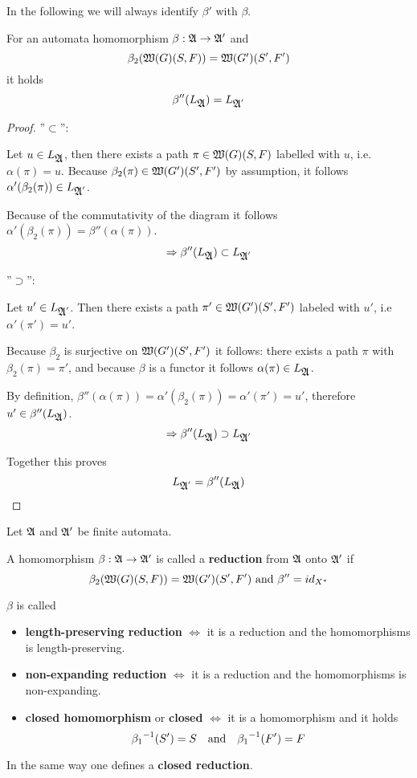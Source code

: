 In the following we will always identify $\beta'$ with $\beta$.

\begin{theorem}
For an automata homomorphism $\beta: \mbox{$\mathfrak{A}$} \to \mbox{$\mathfrak{A'}$}$ and
\[\beta_2(\mbox{$\mathfrak{W}({G})$}(S, F)) = \mbox{$\mathfrak{W}({G'})$}(S', F') \]
it holds
\[ \beta''(L_{\mbox{$\mathfrak{A}$}}) = L_{\mbox{$\mathfrak{A}$}'} \]
\end{theorem}

\begin{proof}\leavevmode

''$\subset$'':

Let $u \in L_{\mbox{$\mathfrak{A}$}}$, then there exists a path $\pi \in \mbox{$\mathfrak{W}({G})$}(S, F)$
labelled with $u$, i.e.\ $\alpha(\pi) = u$. Because $\beta_2(\pi) \in
\mbox{$\mathfrak{W}({G'})$}(S', F')$ by assumption, it follows $\alpha'(\beta_2(\pi)) \in
L_{\mbox{$\mathfrak{A}$}'}$.

Because of the commutativity of the diagram it follows $ \alpha'(\beta_2(\pi))
= \beta''(\alpha(\pi))$.
\[ \Rightarrow \beta''(L_{\mbox{$\mathfrak{A}$}}) \subset L_{\mbox{$\mathfrak{A}$}'} \]

''$\supset$'':

Let $u' \in L_{\mbox{$\mathfrak{A}$}'}$. Then there exists a path $\pi' \in \mbox{$\mathfrak{W}({G'})$}(S', F')$
labeled with $u'$, i.e\ $\alpha'(\pi') = u'$.

Because $\beta_2$ is surjective on $\mbox{$\mathfrak{W}({G'})$}(S', F')$ it follows: there
exists a path $\pi$ with $\beta_2(\pi) = \pi'$, and because $\beta$ is a functor
it follows $\alpha(\pi) \in L_{\mbox{$\mathfrak{A}$}}$.

By definition, $\beta''(\alpha(\pi)) = \alpha'(\beta_2(\pi)) = \alpha'(\pi') =
u'$, therefore $u' \in \beta''(L_{\mbox{$\mathfrak{A}$}})$.
\[ \Rightarrow  \beta''(L_{\mbox{$\mathfrak{A}$}}) \supset L_{\mbox{$\mathfrak{A}$}'} \]

Together this proves \[ L_{\mbox{$\mathfrak{A}$}'} = \beta''(L_{\mbox{$\mathfrak{A}$}}) \]
\end{proof}

\medskip
\begin{definition}
Let $\mbox{$\mathfrak{A}$}$ and $\mbox{$\mathfrak{A'}$}$ be finite automata.

A homomorphism $\beta : \mbox{$\mathfrak{A \to \mbox{$\mathfrak{A'}$}}$}$ is called a {\bf reduction} from
$\mbox{$\mathfrak{A}$}$ onto $\mbox{$\mathfrak{A'}$}$ if 
\[ \beta_2(\mbox{$\mathfrak{W}({G})$}(S, F)) = \mbox{$\mathfrak{W}({G'})$}(S', F') \text{ and }\beta'' =
id_{X^*} \]

$\beta$ is called
\begin{itemize}
  \item[] {\bf length-preserving reduction} $\iff$ it is a reduction and
	the homomorphisms is length-preserving.

	\item[] {\bf non-expanding reduction} $\iff$ it is a reduction and the
	homomorphisms is non-expanding.

	\item[] {\bf closed homomorphism} or {\bf closed} $\iff$ it
	is a homomorphism and it holds
	\[ \mbox{${\beta_1}^{-1}$}(S') = S \quad\text{and}\quad \mbox{${\beta_1}^{-1}$}(F') = F \]
\end{itemize}

In the same way one defines a {\bf closed reduction}.
\end{definition}

